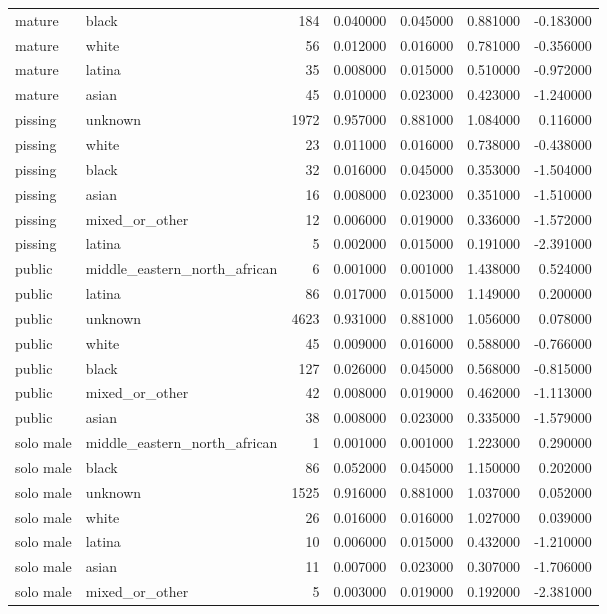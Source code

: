 \begin{tabular}{llrrrrr}
mature & black & 184 & 0.040000 & 0.045000 & 0.881000 & -0.183000 \\
mature & white & 56 & 0.012000 & 0.016000 & 0.781000 & -0.356000 \\
mature & latina & 35 & 0.008000 & 0.015000 & 0.510000 & -0.972000 \\
mature & asian & 45 & 0.010000 & 0.023000 & 0.423000 & -1.240000 \\
pissing & unknown & 1972 & 0.957000 & 0.881000 & 1.084000 & 0.116000 \\
pissing & white & 23 & 0.011000 & 0.016000 & 0.738000 & -0.438000 \\
pissing & black & 32 & 0.016000 & 0.045000 & 0.353000 & -1.504000 \\
pissing & asian & 16 & 0.008000 & 0.023000 & 0.351000 & -1.510000 \\
pissing & mixed_or_other & 12 & 0.006000 & 0.019000 & 0.336000 & -1.572000 \\
pissing & latina & 5 & 0.002000 & 0.015000 & 0.191000 & -2.391000 \\
public & middle_eastern_north_african & 6 & 0.001000 & 0.001000 & 1.438000 & 0.524000 \\
public & latina & 86 & 0.017000 & 0.015000 & 1.149000 & 0.200000 \\
public & unknown & 4623 & 0.931000 & 0.881000 & 1.056000 & 0.078000 \\
public & white & 45 & 0.009000 & 0.016000 & 0.588000 & -0.766000 \\
public & black & 127 & 0.026000 & 0.045000 & 0.568000 & -0.815000 \\
public & mixed_or_other & 42 & 0.008000 & 0.019000 & 0.462000 & -1.113000 \\
public & asian & 38 & 0.008000 & 0.023000 & 0.335000 & -1.579000 \\
solo male & middle_eastern_north_african & 1 & 0.001000 & 0.001000 & 1.223000 & 0.290000 \\
solo male & black & 86 & 0.052000 & 0.045000 & 1.150000 & 0.202000 \\
solo male & unknown & 1525 & 0.916000 & 0.881000 & 1.037000 & 0.052000 \\
solo male & white & 26 & 0.016000 & 0.016000 & 1.027000 & 0.039000 \\
solo male & latina & 10 & 0.006000 & 0.015000 & 0.432000 & -1.210000 \\
solo male & asian & 11 & 0.007000 & 0.023000 & 0.307000 & -1.706000 \\
solo male & mixed_or_other & 5 & 0.003000 & 0.019000 & 0.192000 & -2.381000 \\

\end{tabular}
